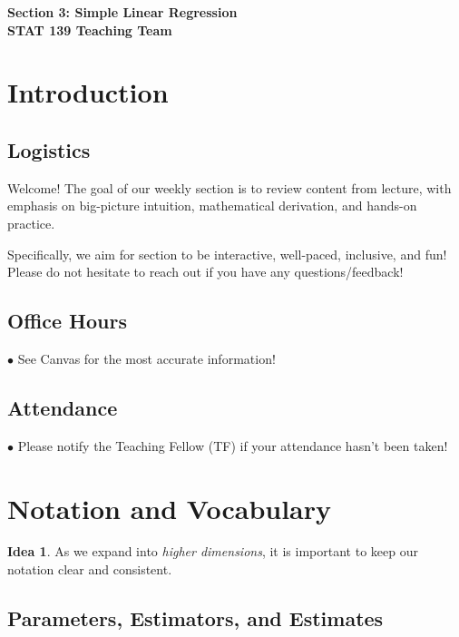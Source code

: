 \documentclass[12pt,oneside]{article}
\theoremstyle{definition}
\newtheorem*{idea}{Idea}
\theoremstyle{remark}
\begin{document}
\pagestyle{fancy}
\begin{center}
\bf \Large
Section 3: Simple Linear Regression \\[0.5em]
\normalsize
STAT 139 Teaching Team
\end{center}

\section{Introduction}

\subsection{Logistics}

Welcome! The goal of our weekly section is to review content from lecture, with emphasis on big-picture intuition, mathematical derivation, and hands-on practice.

Specifically, we aim for section to be interactive, well-paced, inclusive, and fun! Please do not hesitate to reach out if you have any questions/feedback!

\subsection{Office Hours}

$\bullet$ See Canvas for the most accurate information!

\subsection{Attendance}

$\bullet$ Please notify the Teaching Fellow (TF) if your attendance hasn't been taken!

\section{Notation and Vocabulary}

\begin{idea}
As we expand into \textit{higher dimensions}, it is important to keep our notation clear and consistent.
\end{idea}

\subsection{Parameters, Estimators, and Estimates}
\end{document}
